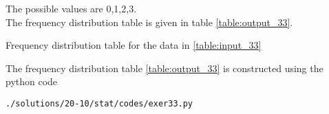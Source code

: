 The possible values are 0,1,2,3.\\
The frequency distribution table is given in table \ref{table:output_33}.
\begin{table}[ht!]
\centering

\caption{Frequency distribution table for the data in \ref{table:input_33}}
\label{table:output_33}
\end{table}
The frequency distribution table \ref{table:output_33} is constructed using the python code
\begin{lstlisting}
./solutions/20-10/stat/codes/exer33.py
\end{lstlisting}
